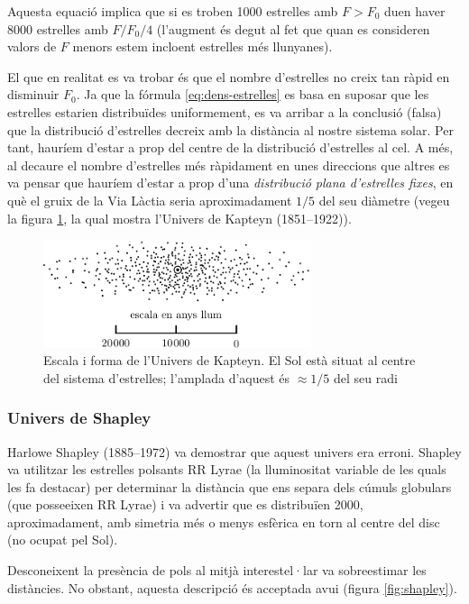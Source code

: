 Aquesta equació implica que si es troben 1000 estrelles amb $F>F_{0}$ duen haver 8000 estrelles amb $F/F_{0}/4$ (l'augment és degut al fet que quan es consideren valors de $F$ menors estem incloent estrelles més llunyanes).

El que en realitat es va trobar és que el nombre d'estrelles no creix tan ràpid en disminuir $F_{0}$. Ja que la fórmula \eqref{eq:dens-estrelles} es basa en suposar que les estrelles estarien distribuïdes uniformement, es va arribar a la conclusió (falsa) que la distribució d'estrelles decreix amb la distància al nostre sistema solar. Per tant, hauríem d'estar a prop del centre de la distribució d'estrelles al cel. A més, al decaure el nombre d'estrelles més ràpidament en unes direccions que altres es va pensar que hauríem d'estar a prop d'una \textit{distribució plana d'estrelles fixes}, en què el gruix de la Via Làctia seria aproximadament $1/5$ del seu diàmetre (vegeu la figura \ref{fig:kapteyn}, la qual mostra l'Univers de Kapteyn (1851--1922)).
\begin{figure}[h]
	\centering
	\includegraphics[width=0.7\textwidth]{./images/6-kapteyn}
	\caption{Escala i forma de l'Univers de Kapteyn. El Sol està situat al centre del sistema d'estrelles; l'amplada d'aquest és $\approx 1/5$ del seu radi}
	\label{fig:kapteyn}
\end{figure}

\subsubsection*{Univers de Shapley}
Harlowe Shapley (1885--1972) va demostrar que aquest univers era erroni. Shapley va utilitzar les estrelles polsants RR Lyrae (la lluminositat variable de les quals les fa destacar) per determinar la distància que ens separa dels cúmuls globulars (que posseeixen RR Lyrae) i va advertir que es distribuïen 2000, aproximadament, amb simetria més o menys esfèrica en torn al centre del disc (no ocupat pel Sol).

Desconeixent la presència de pols al mitjà interestel·lar va sobreestimar les distàncies. No obstant, aquesta descripció és acceptada avui (figura \ref{fig:shapley}).

